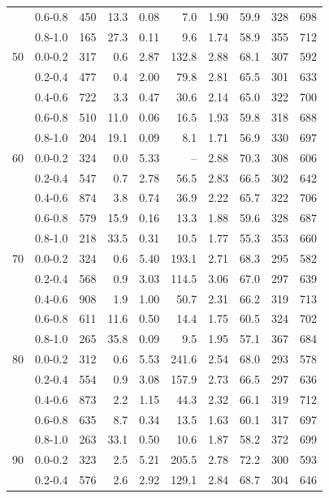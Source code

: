 \begin{tabular}{@{}llrrrrrrrr@{}}
 & 0.6-0.8 & 450 & 13.3 & 0.08 & 7.0 & 1.90 & 59.9 & 328 & 698 \\
 & 0.8-1.0 & 165 & 27.3 & 0.11 & 9.6 & 1.74 & 58.9 & 355 & 712 \\
\midrule
50 & 0.0-0.2 & 317 & 0.6 & 2.87 & 132.8 & 2.88 & 68.1 & 307 & 592 \\
 & 0.2-0.4 & 477 & 0.4 & 2.00 & 79.8 & 2.81 & 65.5 & 301 & 633 \\
 & 0.4-0.6 & 722 & 3.3 & 0.47 & 30.6 & 2.14 & 65.0 & 322 & 700 \\
 & 0.6-0.8 & 510 & 11.0 & 0.06 & 16.5 & 1.93 & 59.8 & 318 & 688 \\
 & 0.8-1.0 & 204 & 19.1 & 0.09 & 8.1 & 1.71 & 56.9 & 330 & 697 \\
\midrule
60 & 0.0-0.2 & 324 & 0.0 & 5.33 & -- & 2.88 & 70.3 & 308 & 606 \\
 & 0.2-0.4 & 547 & 0.7 & 2.78 & 56.5 & 2.83 & 66.5 & 302 & 642 \\
 & 0.4-0.6 & 874 & 3.8 & 0.74 & 36.9 & 2.22 & 65.7 & 322 & 706 \\
 & 0.6-0.8 & 579 & 15.9 & 0.16 & 13.3 & 1.88 & 59.6 & 328 & 687 \\
 & 0.8-1.0 & 218 & 33.5 & 0.31 & 10.5 & 1.77 & 55.3 & 353 & 660 \\
\midrule
70 & 0.0-0.2 & 324 & 0.6 & 5.40 & 193.1 & 2.71 & 68.3 & 295 & 582 \\
 & 0.2-0.4 & 568 & 0.9 & 3.03 & 114.5 & 3.06 & 67.0 & 297 & 639 \\
 & 0.4-0.6 & 908 & 1.9 & 1.00 & 50.7 & 2.31 & 66.2 & 319 & 713 \\
 & 0.6-0.8 & 611 & 11.6 & 0.50 & 14.4 & 1.75 & 60.5 & 324 & 702 \\
 & 0.8-1.0 & 265 & 35.8 & 0.09 & 9.5 & 1.95 & 57.1 & 367 & 684 \\
\midrule
80 & 0.0-0.2 & 312 & 0.6 & 5.53 & 241.6 & 2.54 & 68.0 & 293 & 578 \\
 & 0.2-0.4 & 554 & 0.9 & 3.08 & 157.9 & 2.73 & 66.5 & 297 & 636 \\
 & 0.4-0.6 & 873 & 2.2 & 1.15 & 44.3 & 2.32 & 66.1 & 319 & 712 \\
 & 0.6-0.8 & 635 & 8.7 & 0.34 & 13.5 & 1.63 & 60.1 & 317 & 697 \\
 & 0.8-1.0 & 263 & 33.1 & 0.50 & 10.6 & 1.87 & 58.2 & 372 & 699 \\
\midrule
90 & 0.0-0.2 & 323 & 2.5 & 5.21 & 205.5 & 2.78 & 72.2 & 300 & 593 \\
 & 0.2-0.4 & 576 & 2.6 & 2.92 & 129.1 & 2.84 & 68.7 & 304 & 646 \\

\end{tabular}
